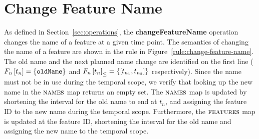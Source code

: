 \section{Change Feature Name}
\label{sec:change-feature-name}

As defined in Section~\ref{sec:operations}, the \textbf{changeFeatureName} operation changes the name of a feature at a given time point. The semantics of changing the name of a feature are shown in the  rule in Figure~\vref{rule:change-feature-name}. The old name and the next planned name change are identified on the first line ($F_n \left[ t_n \right] = \left\{\texttt{oldName}\right\}$ and $\containing{F_n}{t_n} = \set{\interval{t_{n_1}}{t_{n_2}}}$ respectively). Since the name must not be in use during the temporal scope, we verify that looking up the new name in the $\textsc{names}{}$ map returns an empty set. The $\textsc{names}{}$ map is updated by shortening the interval for the old name to end at $t_n$, and assigning the feature ID to the new name during the temporal scope. Furthermore, the $\textsc{features}{}$ map is updated at the feature ID, shortening the interval for the old name and assigning the new name to the temporal scope. 


